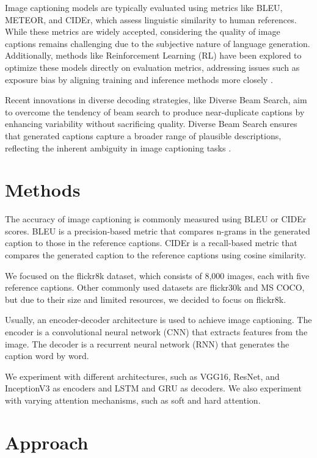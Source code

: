 \documentclass[12pt]{article}
\theoremstyle{plain}
\theoremstyle{definition}
\theoremstyle{remark}
\begin{document}
Image captioning models are typically evaluated using metrics like BLEU, METEOR, and CIDEr, which assess linguistic similarity to human references. While these metrics are widely accepted, considering the quality of image captions remains challenging due to the subjective nature of language generation. Additionally, methods like Reinforcement Learning (RL) have been explored to optimize these models directly on evaluation metrics, addressing issues such as exposure bias by aligning training and inference methods more closely \cite{Rennie}.

Recent innovations in diverse decoding strategies, like Diverse Beam Search, aim to overcome the tendency of beam search to produce near-duplicate captions by enhancing variability without sacrificing quality. Diverse Beam Search ensures that generated captions capture a broader range of plausible descriptions, reflecting the inherent ambiguity in image captioning tasks \cite{Vijayakumar}.

\section{Methods}
\label{sec:methods}

The accuracy of image captioning is commonly measured using BLEU or CIDEr scores. BLEU is a precision-based metric that compares n-grams in the generated caption to those in the reference captions. CIDEr is a recall-based metric that compares the generated caption to the reference captions using cosine similarity.

We focused on the flickr8k dataset, which consists of 8,000 images, each with five reference captions. Other commonly used datasets are flickr30k and MS COCO, but due to their size and limited resources, we decided to focus on flickr8k.

Usually, an encoder-decoder architecture is used to achieve image captioning. The encoder is a convolutional neural network (CNN) that extracts features from the image. The decoder is a recurrent neural network (RNN) that generates the caption word by word.

We experiment with different architectures, such as VGG16, ResNet, and InceptionV3 as encoders and LSTM and GRU as decoders. We also experiment with varying attention mechanisms, such as soft and hard attention.

\section{Approach}
\label{sec:approach}
\end{document}

